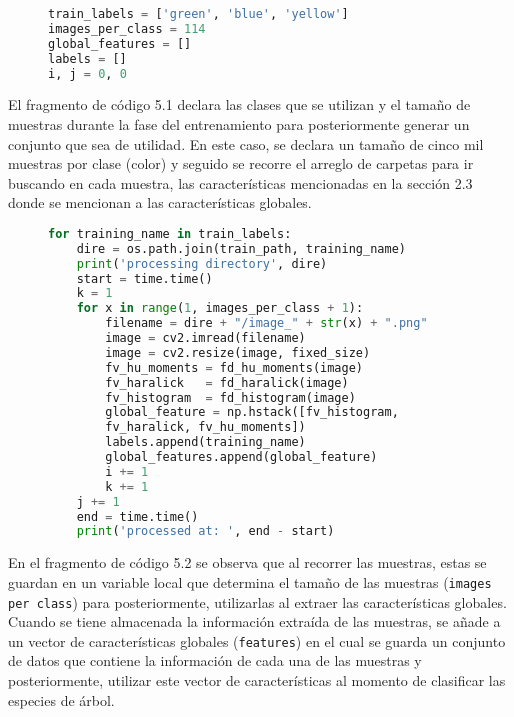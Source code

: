 \begin{figure}[H]
\centering
\begin{lstlisting}[basicstyle=\small, language=Python, caption=Declaración de variables]
train_labels = ['green', 'blue', 'yellow']
images_per_class = 114 
global_features = []
labels = []
i, j = 0, 0
\end{lstlisting}
\label{Declaracion-variables}
\end{figure}

El fragmento de código 5.1 declara las clases que se utilizan y el tamaño de muestras durante la fase del entrenamiento para posteriormente generar un conjunto que sea de utilidad. En este caso, se declara un tamaño de cinco mil muestras por clase (color) y seguido se recorre el arreglo de carpetas para ir buscando en cada muestra, las características mencionadas en la sección 2.3 donde se mencionan a las características globales.

\begin{figure}[H]
\centering
\begin{lstlisting}[basicstyle=\small, language=Python, caption=Código para entrenar modelo]
for training_name in train_labels:
    dire = os.path.join(train_path, training_name)
    print('processing directory', dire)
    start = time.time()
    k = 1
    for x in range(1, images_per_class + 1):
        filename = dire + "/image_" + str(x) + ".png"
        image = cv2.imread(filename)
        image = cv2.resize(image, fixed_size)
        fv_hu_moments = fd_hu_moments(image)
        fv_haralick   = fd_haralick(image)
        fv_histogram  = fd_histogram(image)
        global_feature = np.hstack([fv_histogram, 
        fv_haralick, fv_hu_moments])
        labels.append(training_name)
        global_features.append(global_feature)
        i += 1
        k += 1
    j += 1
    end = time.time()
    print('processed at: ', end - start)
\end{lstlisting}
\label{Recorriendo-folders}
\end{figure}

En el fragmento de código 5.2 se observa que al recorrer las muestras, estas se guardan en un variable local que determina el tamaño de las muestras (\texttt{images per class}) para posteriormente, utilizarlas al extraer las características globales. Cuando se tiene almacenada la información extraída de las muestras, se añade a un vector de características globales (\texttt{features}) en el cual se guarda un conjunto de datos que contiene la información de cada una de las muestras y posteriormente, utilizar este vector de características al momento de clasificar las especies de árbol. 
\clearpage

